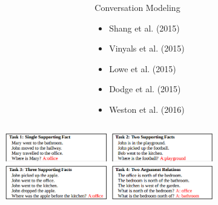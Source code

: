 \documentclass{beamer}
\begin{document}
\begin{frame}
\begin{figure}
\begin{minipage}[t][7cm][t]{\textwidth}
\begin{overprint}
\begin{columns}
\begin{column}{0.6\textwidth}
\begin{figure}[ht]
							\end{figure}
						\end{column}
						\begin{column}{0.4\textwidth}
							\begin{block}{Conversation Modeling}
								\begin{itemize}
									\item Shang et al. (2015) 
									\item Vinyals et al. (2015)
									\item Lowe et al. (2015)
									\item Dodge et al. (2015)
									\item Weston et al. (2016)
								\end{itemize}
							\end{block}
						\end{column}
					\end{columns}
					
					\onslide<5>
					\begin{columns}
						\begin{column}{0.6\textwidth}
							\begin{figure}[ht]
								\centering
								\includegraphics[width=1\linewidth]{images/qa2}
								\label{fig:qa}
								

\end{figure}
\end{column}
\end{columns}
\end{overprint}
\end{minipage}
\end{figure}
\end{frame}
\end{document}
